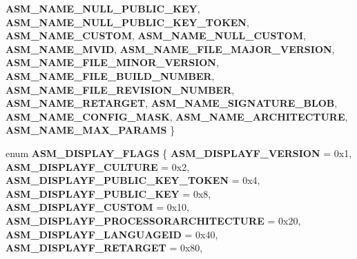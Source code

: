 \begin{DoxyCompactItemize}
{\bfseries A\+S\+M\+\_\+\+N\+A\+M\+E\+\_\+\+N\+U\+L\+L\+\_\+\+P\+U\+B\+L\+I\+C\+\_\+\+K\+EY}, 
\newline
{\bfseries A\+S\+M\+\_\+\+N\+A\+M\+E\+\_\+\+N\+U\+L\+L\+\_\+\+P\+U\+B\+L\+I\+C\+\_\+\+K\+E\+Y\+\_\+\+T\+O\+K\+EN}, 
{\bfseries A\+S\+M\+\_\+\+N\+A\+M\+E\+\_\+\+C\+U\+S\+T\+OM}, 
{\bfseries A\+S\+M\+\_\+\+N\+A\+M\+E\+\_\+\+N\+U\+L\+L\+\_\+\+C\+U\+S\+T\+OM}, 
{\bfseries A\+S\+M\+\_\+\+N\+A\+M\+E\+\_\+\+M\+V\+ID}, 
\newline
{\bfseries A\+S\+M\+\_\+\+N\+A\+M\+E\+\_\+\+F\+I\+L\+E\+\_\+\+M\+A\+J\+O\+R\+\_\+\+V\+E\+R\+S\+I\+ON}, 
{\bfseries A\+S\+M\+\_\+\+N\+A\+M\+E\+\_\+\+F\+I\+L\+E\+\_\+\+M\+I\+N\+O\+R\+\_\+\+V\+E\+R\+S\+I\+ON}, 
{\bfseries A\+S\+M\+\_\+\+N\+A\+M\+E\+\_\+\+F\+I\+L\+E\+\_\+\+B\+U\+I\+L\+D\+\_\+\+N\+U\+M\+B\+ER}, 
{\bfseries A\+S\+M\+\_\+\+N\+A\+M\+E\+\_\+\+F\+I\+L\+E\+\_\+\+R\+E\+V\+I\+S\+I\+O\+N\+\_\+\+N\+U\+M\+B\+ER}, 
\newline
{\bfseries A\+S\+M\+\_\+\+N\+A\+M\+E\+\_\+\+R\+E\+T\+A\+R\+G\+ET}, 
{\bfseries A\+S\+M\+\_\+\+N\+A\+M\+E\+\_\+\+S\+I\+G\+N\+A\+T\+U\+R\+E\+\_\+\+B\+L\+OB}, 
{\bfseries A\+S\+M\+\_\+\+N\+A\+M\+E\+\_\+\+C\+O\+N\+F\+I\+G\+\_\+\+M\+A\+SK}, 
{\bfseries A\+S\+M\+\_\+\+N\+A\+M\+E\+\_\+\+A\+R\+C\+H\+I\+T\+E\+C\+T\+U\+RE}, 
\newline
{\bfseries A\+S\+M\+\_\+\+N\+A\+M\+E\+\_\+\+M\+A\+X\+\_\+\+P\+A\+R\+A\+MS}
 \}
\item 
\mbox{\label{interface_i_assembly_name_aea8130a53a1d50dfc5a7a7115a8010f3}} 
enum {\bfseries A\+S\+M\+\_\+\+D\+I\+S\+P\+L\+A\+Y\+\_\+\+F\+L\+A\+GS} \{ \newline
{\bfseries A\+S\+M\+\_\+\+D\+I\+S\+P\+L\+A\+Y\+F\+\_\+\+V\+E\+R\+S\+I\+ON} = 0x1, 
{\bfseries A\+S\+M\+\_\+\+D\+I\+S\+P\+L\+A\+Y\+F\+\_\+\+C\+U\+L\+T\+U\+RE} = 0x2, 
{\bfseries A\+S\+M\+\_\+\+D\+I\+S\+P\+L\+A\+Y\+F\+\_\+\+P\+U\+B\+L\+I\+C\+\_\+\+K\+E\+Y\+\_\+\+T\+O\+K\+EN} = 0x4, 
{\bfseries A\+S\+M\+\_\+\+D\+I\+S\+P\+L\+A\+Y\+F\+\_\+\+P\+U\+B\+L\+I\+C\+\_\+\+K\+EY} = 0x8, 
\newline
{\bfseries A\+S\+M\+\_\+\+D\+I\+S\+P\+L\+A\+Y\+F\+\_\+\+C\+U\+S\+T\+OM} = 0x10, 
{\bfseries A\+S\+M\+\_\+\+D\+I\+S\+P\+L\+A\+Y\+F\+\_\+\+P\+R\+O\+C\+E\+S\+S\+O\+R\+A\+R\+C\+H\+I\+T\+E\+C\+T\+U\+RE} = 0x20, 
{\bfseries A\+S\+M\+\_\+\+D\+I\+S\+P\+L\+A\+Y\+F\+\_\+\+L\+A\+N\+G\+U\+A\+G\+E\+ID} = 0x40, 
{\bfseries A\+S\+M\+\_\+\+D\+I\+S\+P\+L\+A\+Y\+F\+\_\+\+R\+E\+T\+A\+R\+G\+ET} = 0x80, 
\newline

\end{DoxyCompactItemize}
